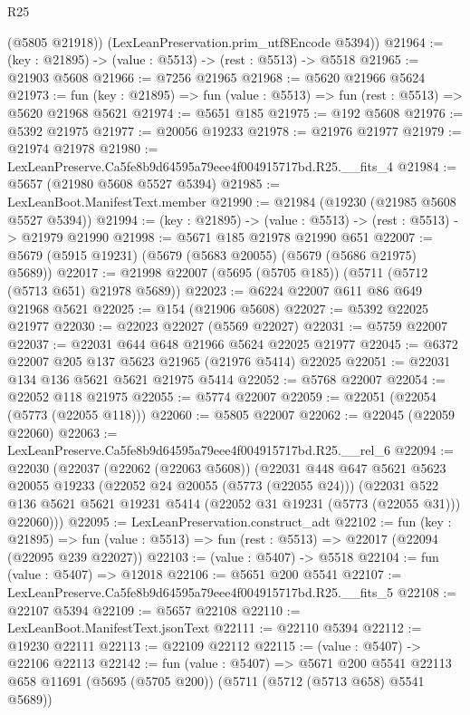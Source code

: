 \begin{lexlean}{R25}
\begin{coremodule}
        (@5805 @21918))
      (LexLeanPreservation.prim_utf8Encode @5394))
@21964 := (key : @21895) -> (value : @5513) -> (rest : @5513) -> @5518
@21965 := @21903 @5608
@21966 := @7256 @21965
@21968 := @5620 @21966 @5624
@21973 := fun (key : @21895) => fun (value : @5513) => fun (rest : @5513) => @5620 @21968 @5621
@21974 := @5651 @185
@21975 := @192 @5608
@21976 := @5392 @21975
@21977 := @20056 @19233
@21978 := @21976 @21977
@21979 := @21974 @21978
@21980 := LexLeanPreserve.Ca5fe8b9d64595a79eee4f004915717bd.R25.__fits_4
@21984 := @5657 (@21980 @5608 @5527 @5394)
@21985 := LexLeanBoot.ManifestText.member
@21990 := @21984 (@19230 (@21985 @5608 @5527 @5394))
@21994 := (key : @21895) -> (value : @5513) -> (rest : @5513) -> @21979 @21990
@21998 := @5671 @185 @21978 @21990 @651
@22007 := @5679 (@5915 @19231) (@5679 (@5683 @20055) (@5679 (@5686 @21975) @5689))
@22017 := @21998 @22007 (@5695 (@5705 @185)) (@5711 (@5712 (@5713 @651) @21978 @5689))
@22023 := @6224 @22007 @611 @86 @649 @21968 @5621
@22025 := @154 (@21906 @5608)
@22027 := @5392 @22025 @21977
@22030 := @22023 @22027 (@5569 @22027)
@22031 := @5759 @22007
@22037 := @22031 @644 @648 @21966 @5624 @22025 @21977
@22045 := @6372 @22007 @205 @137 @5623 @21965 (@21976 @5414) @22025
@22051 := @22031 @134 @136 @5621 @5621 @21975 @5414
@22052 := @5768 @22007
@22054 := @22052 @118 @21975
@22055 := @5774 @22007
@22059 := @22051 (@22054 (@5773 (@22055 @118)))
@22060 := @5805 @22007
@22062 := @22045 (@22059 @22060)
@22063 := LexLeanPreserve.Ca5fe8b9d64595a79eee4f004915717bd.R25.__rel_6
@22094 := @22030
    (@22037
      (@22062 (@22063 @5608))
      (@22031
        @448
        @647
        @5621
        @5623
        @20055
        @19233
        (@22052 @24 @20055 (@5773 (@22055 @24)))
        (@22031
          @522
          @136
          @5621
          @5621
          @19231
          @5414
          (@22052 @31 @19231 (@5773 (@22055 @31)))
          @22060)))
@22095 := LexLeanPreservation.construct_adt
@22102 := fun (key : @21895) =>
  fun (value : @5513) => fun (rest : @5513) => @22017 (@22094 (@22095 @239 @22027))
@22103 := (value : @5407) -> @5518
@22104 := fun (value : @5407) => @12018
@22106 := @5651 @200 @5541
@22107 := LexLeanPreserve.Ca5fe8b9d64595a79eee4f004915717bd.R25.__fits_5
@22108 := @22107 @5394
@22109 := @5657 @22108
@22110 := LexLeanBoot.ManifestText.jsonText
@22111 := @22110 @5394
@22112 := @19230 @22111
@22113 := @22109 @22112
@22115 := (value : @5407) -> @22106 @22113
@22142 := fun (value : @5407) =>
  @5671
    @200
    @5541
    @22113
    @658
    @11691
    (@5695 (@5705 @200))
    (@5711 (@5712 (@5713 @658) @5541 @5689))

\end{coremodule}
\end{lexlean}
